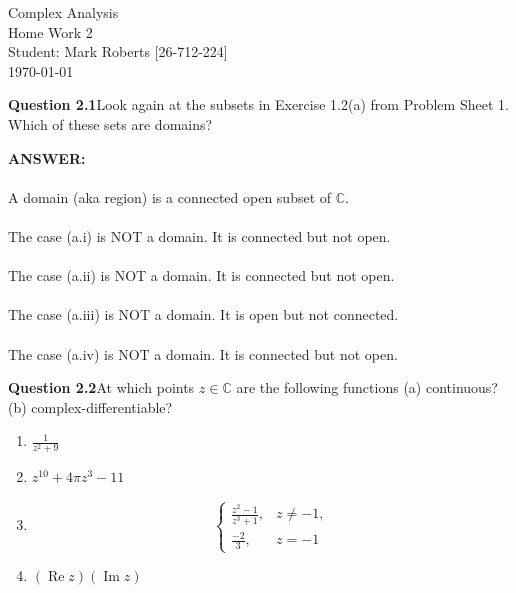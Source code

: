 \documentclass[12pt,a4paper]{article}
\newcommand{\question}[2]{\textbf{Question #1}\quad #2}
\begin{document}
\begin{titlepage}
\centering
\vspace*{\fill} %

{\Huge Complex Analysis} \\[0.5cm] %
{\Huge Home Work 2}\\[1.5cm] %
{\Large Student: Mark Roberts [26-712-224]}\\[0.5cm] %
{\Large \today} %

\vspace*{\fill}
\end{titlepage}
\newpage

\question{2.1}{Look again at the subsets in Exercise 1.2(a) from Problem Sheet 1. Which of these sets are domains?}

\vspace{1cm}

\textbf{ANSWER:}\\
\\
A domain (aka region) is a connected open subset of $\mathbb{C}$.\\
\\
The case (a.i) is NOT a domain.  It is connected but not open.\\
\\
The case (a.ii) is NOT a domain.  It is connected but not open.\\
\\
The case (a.iii) is NOT a domain.  It is open but not connected.\\
\\
The case (a.iv) is NOT a domain.  It is connected but not open.
\newpage

\question{2.2}{At which points $z \in \mathbb{C}$ are the following functions
(a) continuous? (b) complex-differentiable?}

\begin{enumerate}[label=(\roman*)]
    \item $\displaystyle \frac{1}{z^2+9}$

    \item $\displaystyle z^{10}+4\pi z^3-11$

    \item
    \[
    \begin{cases}
    \displaystyle \frac{z^2-1}{z^3+1}, & z\neq -1,\\[4pt]
    \frac{-2}{3}, & z=-1
    \end{cases}
    \]

    \item $(\operatorname{Re} z)(\operatorname{Im} z)$
\end{enumerate}
\end{document}
